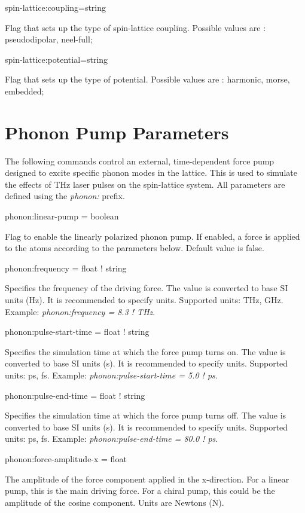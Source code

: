 {\zicf spin-lattice:coupling=string}
 Flag that sets up the type of spin-lattice coupling. Possible values are : pseudodipolar, {neel-full};

 {\zicf spin-lattice:potential=string}
 Flag that sets up the type of potential. Possible values are : harmonic, morse, embedded;


\section*{Phonon Pump Parameters}
The following commands control an external, time-dependent force pump designed to excite specific phonon modes in the lattice. This is used to simulate the effects of THz laser pulses on the spin-lattice system. All parameters are defined using the \textit{phonon:} prefix.

{\zicf phonon:linear-pump = boolean}
Flag to enable the linearly polarized phonon pump. If enabled, a force is applied to the atoms according to the parameters below. Default value is false.

{\zicf phonon:frequency = float ! string}
Specifies the frequency of the driving force. The value is converted to base SI units (Hz). It is recommended to specify units. Supported units: THz, GHz. Example: \textit{phonon:frequency = 8.3 ! THz}.

{\zicf phonon:pulse-start-time = float ! string}
Specifies the simulation time at which the force pump turns on. The value is converted to base SI units (s). It is recommended to specify units. Supported units: ps, fs. Example: \textit{phonon:pulse-start-time = 5.0 ! ps}.

{\zicf phonon:pulse-end-time = float ! string}
Specifies the simulation time at which the force pump turns off. The value is converted to base SI units (s). It is recommended to specify units. Supported units: ps, fs. Example: \textit{phonon:pulse-end-time = 80.0 ! ps}.

{\zicf phonon:force-amplitude-x = float}
The amplitude of the force component applied in the x-direction. For a linear pump, this is the main driving force. For a chiral pump, this could be the amplitude of the cosine component. Units are Newtons (N).

